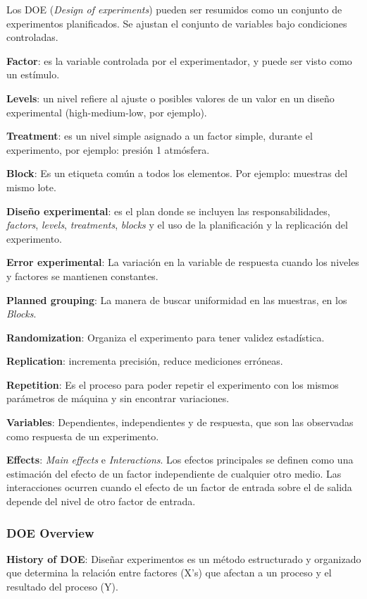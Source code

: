 \documentclass[]{article}
\begin{document}
Los DOE (\textit{Design of experiments}) pueden ser resumidos como un conjunto de experimentos planificados. Se ajustan el conjunto de variables bajo condiciones controladas.

\textbf{Factor}: es la variable controlada por el experimentador, y puede ser visto como un estímulo.

\textbf{Levels}: un nivel refiere al ajuste o posibles valores de un valor en un diseño experimental (high-medium-low, por ejemplo).

\textbf{Treatment}: es un nivel simple asignado a un factor simple, durante el experimento, por ejemplo: presión 1 atmósfera.

\textbf{Block}: Es un etiqueta común a todos los elementos. Por ejemplo: muestras del mismo lote.

\textbf{Diseño experimental}: es el plan donde se incluyen las responsabilidades, \textit{factors}, \textit{levels}, \textit{treatments}, \textit{blocks} y el uso de la planificación y la replicación del experimento.

\textbf{Error experimental}: La variación en la variable de respuesta cuando los niveles y factores se mantienen constantes.

\textbf{Planned grouping}: La manera de buscar uniformidad en las muestras, en los \textit{Blocks}.

\textbf{Randomization}: Organiza el experimento para tener validez estadística.

\textbf{Replication}: incrementa precisión, reduce mediciones erróneas.

\textbf{Repetition}: Es el proceso para poder repetir el experimento con los mismos parámetros de máquina y sin encontrar variaciones.

\textbf{Variables}: Dependientes, independientes y de respuesta, que son las observadas como respuesta de un experimento.

\textbf{Effects}: \textit{Main effects} e \textit{Interactions}. Los efectos principales se definen como una estimación del efecto de un factor independiente de cualquier otro medio. Las interacciones ocurren cuando el efecto de un factor de entrada sobre el de salida depende del nivel de otro factor de entrada.

\subsubsection{DOE Overview}

\textbf{History of DOE}: Diseñar experimentos es un método estructurado y organizado que determina la relación entre factores (X's) que afectan a un proceso y el resultado del proceso (Y).
\end{document}

